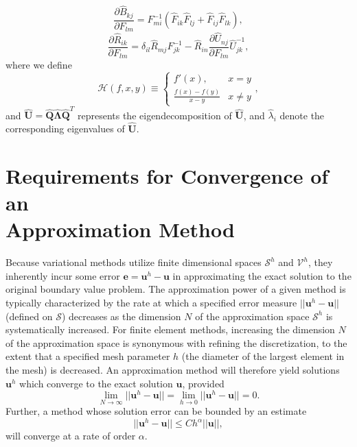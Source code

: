 	\begin{equation}
		\frac{\partial \hat{B}_{kj}}{\partial F_{lm}} = F^{-1}_{mi} (\hat{F}_{ik} \hat{F}_{lj} + \hat{F}_{ij} \hat{F}_{lk}),
	\end{equation}
	\begin{equation}
		\frac{\partial \hat{R}_{ik}}{\partial F_{lm}} = \delta_{il} \hat{R}_{mj} F^{-1}_{jk} - \hat{R}_{in} \frac{\partial \hat{U}_{nj}}{\partial F_{lm}} \hat{U}_{jk}^{-1},
	\end{equation}
	where we define
	\begin{equation}
		\mathcal{H} (f, x, y) \equiv \left\{ \begin{array}{cc} f'(x), & x = y \\
		\frac{f(x) - f(y)}{x - y} & x \neq y \end{array} \right. ,
	\end{equation}
	and $\hat{\mathbf{U}} = \hat{\mathbf{Q}} \hat{\boldsymbol{\Lambda}} \hat{\mathbf{Q}}^T$ represents the eigendecomposition of $\hat{\mathbf{U}}$, and $\hat{\lambda}_i$ denote the corresponding eigenvalues of $\hat{\mathbf{U}}$.

\section{Requirements for Convergence of an \\ Approximation Method}

Because variational methods utilize finite dimensional spaces $\mathcal{S}^h$ and $\mathcal{V}^h$, they inherently incur some error $\mathbf{e} = \mathbf{u}^h - \mathbf{u}$ in approximating the exact solution to the original boundary value problem. The  approximation power of a given method is typically characterized by the rate at which a specified error measure $||\mathbf{u}^h - \mathbf{u}||$ (defined on $\mathcal{S}$) decreases as the dimension $N$ of the approximation space $\mathcal{S}^h$ is systematically increased. For finite element methods, increasing the dimension $N$ of the approximation space is synonymous with refining the discretization, to the extent that a specified mesh parameter $h$ (the diameter of the largest element in the mesh) is decreased. An approximation method will therefore yield solutions $\mathbf{u}^h$ which converge to the exact solution $\mathbf{u}$, provided
\begin{equation}
	\lim_{N \rightarrow \infty} ||\mathbf{u}^h - \mathbf{u}|| = \lim_{h \rightarrow 0} ||\mathbf{u}^h - \mathbf{u}|| = 0.
\end{equation}
Further, a method whose solution error can be bounded by an estimate
\begin{equation}
	||\mathbf{u}^h - \mathbf{u}|| \leq C h^\alpha ||\mathbf{u}||,
\end{equation}
will converge at a rate of order $\alpha$.

